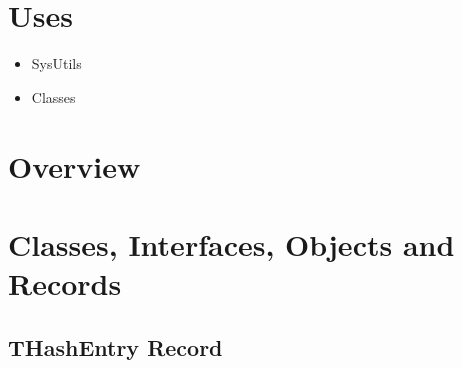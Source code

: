 \documentclass{report}
\newif\ifpdf
\begin{document}
\section{Uses}
\begin{itemize}
\item \begin{ttfamily}SysUtils\end{ttfamily}\item \begin{ttfamily}Classes\end{ttfamily}\end{itemize}
\section{Overview}
\begin{description}
\item[\texttt{\begin{ttfamily}THashEntry\end{ttfamily} Record}]
\item[\texttt{\begin{ttfamily}THash\end{ttfamily} Class}]
\item[\texttt{\begin{ttfamily}TObjectHash\end{ttfamily} Class}]
\end{description}
\section{Classes, Interfaces, Objects and Records}
\ifpdf
\subsection*{\large{\textbf{THashEntry Record}}\normalsize\hspace{1ex}\hrulefill}
\else
\subsection*{THashEntry Record}
\fi
\label{PasDoc_Hashes.THashEntry}
\end{document}
